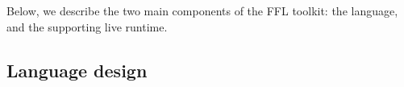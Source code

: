 Below, we describe the two main components of the FFL toolkit: the language, and the supporting live runtime.


\subsection{Language design}


